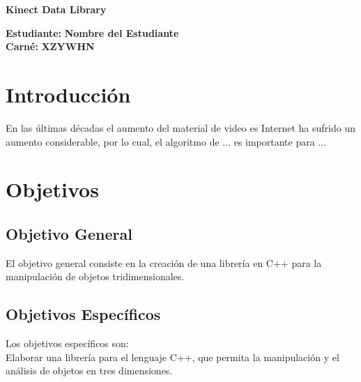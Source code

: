 \documentclass[letterpaper]{article}
\begin{document}
\vspace*{2cm}

\begin{center}
\Huge
\textbf{Kinect Data Library}
\vspace*{1cm}
\end{center}

\noindent
\small\baselineskip=14pt
\textbf{Estudiante:} \textbf{Nombre del Estudiante}\\
\textbf{Carné:} \textbf{XZYWHN}\\

\section{Introducción}

En las últimas décadas el aumento del material de video es Internet ha sufrido un aumento considerable, por lo cual, el algoritmo de ... es importante para ... 

\section{Objetivos}

\subsection{Objetivo General}


El objetivo general consiste en la creación de una librería en C++ para la manipulación de objetos tridimensionales.\\

\subsection{Objetivos Específicos}
Los objetivos específicos son:\\

Elaborar una librería para el lenguaje C++, que permita la manipulación y el análisis de objetos en tres dimensiones.\\
\end{document}
